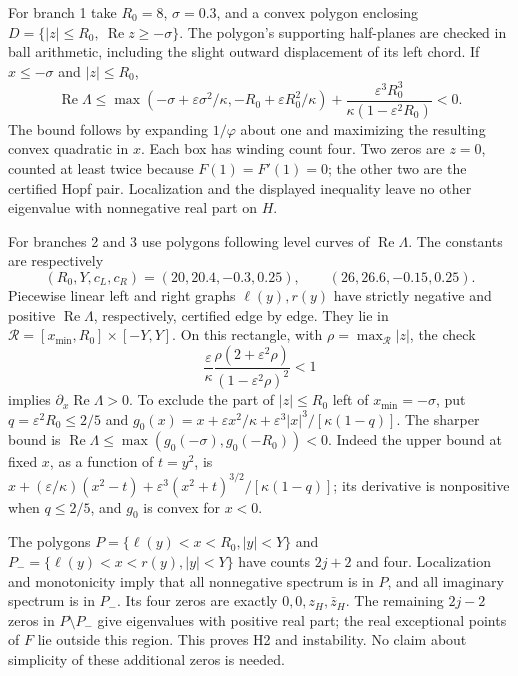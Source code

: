 For branch 1 take $R_0=8$, $\sigma=0.3$, and a convex polygon enclosing
$D=\{|z|\le R_0,\ \operatorname{Re}z\ge-\sigma\}$.
The polygon's supporting half-planes are checked in ball arithmetic, including the
slight outward displacement of its left chord. If $x\le-\sigma$ and $|z|\le R_0$,
\[
 \operatorname{Re}\Lambda\le
 \max(-\sigma+\varepsilon\sigma^2/\kappa,-R_0+\varepsilon R_0^2/\kappa)
 +\frac{\varepsilon^3R_0^3}{\kappa(1-\varepsilon^2R_0)}<0.
\]
The bound follows by expanding $1/\varphi$ about one and maximizing the resulting convex
quadratic in $x$. Each box has winding count four. Two zeros are $z=0$, counted at least
twice because $F(1)=F'(1)=0$; the other two are the certified Hopf pair. Localization
and the displayed inequality leave no other eigenvalue with nonnegative real part on $H$.

For branches 2 and 3 use polygons following level curves of $\operatorname{Re}\Lambda$.
The constants are respectively
\[
 (R_0,Y,c_L,c_R)=(20,20.4,-0.3,0.25),\qquad(26,26.6,-0.15,0.25).
\]
Piecewise linear left and right graphs $\ell(y),r(y)$ have strictly negative and positive
$\operatorname{Re}\Lambda$, respectively, certified edge by edge. They lie in
$\mathcal R=[x_{\min},R_0]\times[-Y,Y]$. On this rectangle, with
$\rho=\max_{\mathcal R}|z|$, the check
\[
 \frac{\varepsilon}{\kappa}\frac{\rho(2+\varepsilon^2\rho)}{(1-\varepsilon^2\rho)^2}<1
\]
implies $\partial_x\operatorname{Re}\Lambda>0$. To exclude the part of $|z|\le R_0$
left of $x_{\min}=-\sigma$, put $q=\varepsilon^2R_0\le2/5$ and
$g_0(x)=x+\varepsilon x^2/\kappa+\varepsilon^3|x|^3/[\kappa(1-q)]$.
The sharper bound is $\operatorname{Re}\Lambda\le\max(g_0(-\sigma),g_0(-R_0))<0$.
Indeed the upper bound at fixed $x$, as a function of $t=y^2$, is
$x+(\varepsilon/\kappa)(x^2-t)+\varepsilon^3(x^2+t)^{3/2}/[\kappa(1-q)]$;
its derivative is nonpositive when $q\le2/5$, and $g_0$ is convex for $x<0$.

The polygons $P=\{\ell(y)<x<R_0,|y|<Y\}$ and
$P_-=\{\ell(y)<x<r(y),|y|<Y\}$ have counts $2j+2$ and four. Localization and
monotonicity imply that all nonnegative spectrum is in $P$, and all imaginary spectrum
is in $P_-$. Its four zeros are exactly $0,0,z_H,\bar z_H$.
The remaining $2j-2$ zeros in $P\setminus P_-$ give eigenvalues with positive real part;
the real exceptional points of $F$ lie outside this region. This proves H2 and instability.
No claim about simplicity of these additional zeros is needed.

